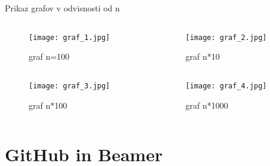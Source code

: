 \documentclass{beamer}
\begin{document}
\begin{frame}{Prikaz grafov v odvisnosti od n}

\begin{columns}[T]
  \begin{column}{0.5\textwidth}
    \begin{figure}
      \texttt{[image: graf\_1.jpg]}
      \vspace*{-0.5cm}
      \caption{graf n=100}
    \end{figure}
  \end{column}
  \begin{column}{0.5\textwidth}
    \begin{figure}
      \texttt{[image: graf\_2.jpg]}
      \vspace*{-0.5cm}
      \caption{graf n*10}
    \end{figure}
  \end{column}
\end{columns}

\begin{columns}[T]
  \begin{column}{0.5\textwidth}
    \begin{figure}
      \texttt{[image: graf\_3.jpg]}
      \vspace*{-0.5cm}
      \caption{graf n*100}
    \end{figure}
  \end{column}
  \begin{column}{0.5\textwidth}
    \begin{figure}
      \texttt{[image: graf\_4.jpg]}
      \vspace*{-0.5cm}
      \caption{graf n*1000}
    \end{figure}
  \end{column}
\end{columns}
\end{frame}


\section{GitHub in Beamer}
\end{document}
